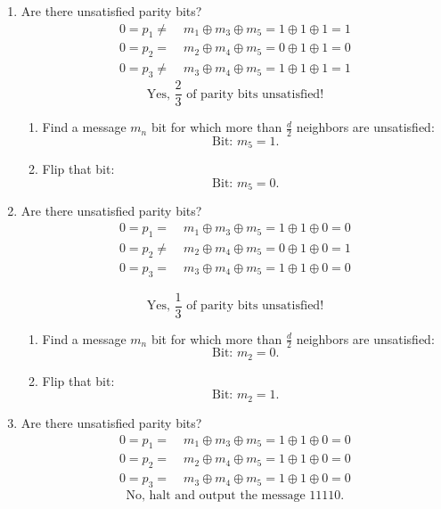 \documentclass{AssignmentCUNY}
\begin{document}
\begin{enumerate}[label=\textbf{\emph{Round} \arabic*:}, leftmargin=*]

\item Are there unsatisfied parity bits?
\begin{align*}
	0 = p_1 \not =&\; m_1 \oplus m_3 \oplus m_5 = 1 \oplus 1 \oplus 1 = 1 \\
	0 = p_2      =&\; m_2 \oplus m_4 \oplus m_5 = 0 \oplus 1 \oplus 1 = 0 \\
	0 = p_3 \not =&\; m_3 \oplus m_4 \oplus m_5 = 1 \oplus 1 \oplus 1 = 1
\end{align*}
\[
\text{Yes, } \frac{2}{3} \text{ of parity bits unsatisfied!}
\]

\begin{enumerate}[label=\textbf{\emph{Step} \arabic*:}]

\item Find a message $m_n$ bit for which more than $\frac{d}{2}$ neighbors are unsatisfied:
\[
\text{Bit: } m_5 = 1\text{.}
\]

\item Flip that bit:
\[
\text{Bit: } m_5 = 0\text{.}
\]

\end{enumerate}

\item Are there unsatisfied parity bits?
\begin{align*}
	0 = p_1      =&\; m_1 \oplus m_3 \oplus m_5 = 1 \oplus 1 \oplus 0 = 0 \\
	0 = p_2 \not =&\; m_2 \oplus m_4 \oplus m_5 = 0 \oplus 1 \oplus 0 = 1 \\
	0 = p_3      =&\; m_3 \oplus m_4 \oplus m_5 = 1 \oplus 1 \oplus 0 = 0
\end{align*}

\[
\text{Yes, } \frac{1}{3} \text{ of parity bits unsatisfied!}
\]

\begin{enumerate}[label=\textbf{\emph{Step} \arabic*:}]

\item Find a message $m_n$ bit for which more than $\frac{d}{2}$ neighbors are unsatisfied:
\[
\text{Bit: } m_2 = 0\text{.}
\]

\item Flip that bit:
\[
\text{Bit: } m_2 = 1\text{.}
\]	

\end{enumerate}

\item Are there unsatisfied parity bits?
\begin{align*}
	0 = p_1      =&\; m_1 \oplus m_3 \oplus m_5 = 1 \oplus 1 \oplus 0 = 0 \\
	0 = p_2      =&\; m_2 \oplus m_4 \oplus m_5 = 1 \oplus 1 \oplus 0 = 0 \\
	0 = p_3      =&\; m_3 \oplus m_4 \oplus m_5 = 1 \oplus 1 \oplus 0 = 0
\end{align*}
\[
\text{No, halt and output the message } 11110\text{.}
\]

\end{enumerate}
\end{document}
